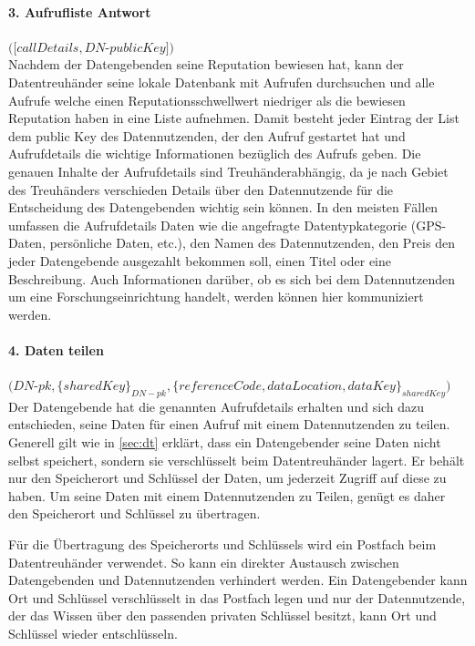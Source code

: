 \documentclass[11pt,a4paper]{scrreprt}
\begin{document}
\paragraph{3. Aufrufliste Antwort} $([callDetails, DN$-$publicKey])$\\
Nachdem der Datengebenden seine Reputation bewiesen hat, kann der Datentreuhänder seine lokale Datenbank mit Aufrufen durchsuchen und alle Aufrufe welche einen Reputationsschwellwert niedriger als die bewiesen Reputation haben in eine Liste aufnehmen. Damit besteht jeder Eintrag der List dem public Key des Datennutzenden, der den Aufruf gestartet hat und Aufrufdetails die wichtige Informationen bezüglich des Aufrufs geben. Die genauen Inhalte der Aufrufdetails sind Treuhänderabhängig, da je nach Gebiet des Treuhänders verschieden Details über den Datennutzende für die Entscheidung des Datengebenden wichtig sein können. In den meisten Fällen umfassen die Aufrufdetails Daten wie die angefragte Datentypkategorie (GPS-Daten, persönliche Daten, etc.), den Namen des Datennutzenden, den Preis den jeder Datengebende ausgezahlt bekommen soll, einen Titel oder eine Beschreibung. Auch Informationen darüber, ob es sich bei dem Datennutzenden um eine Forschungseinrichtung handelt, werden können hier kommuniziert werden.


\paragraph{4. Daten teilen} $(DN$-$pk, \{sharedKey\}_{DN-pk}, \{referenceCode, dataLocation, dataKey\}_{sharedKey})$\\
Der Datengebende hat die genannten Aufrufdetails erhalten und sich dazu entschieden, seine Daten für einen Aufruf mit einem Datennutzenden zu teilen. Generell gilt wie in \ref{sec:dt} erklärt, dass ein Datengebender seine Daten nicht selbst speichert, sondern sie verschlüsselt beim Datentreuhänder lagert. Er behält nur den Speicherort und Schlüssel der Daten, um jederzeit Zugriff auf diese zu haben. Um seine Daten mit einem Datennutzenden zu Teilen, genügt es daher den Speicherort und Schlüssel zu übertragen.

Für die Übertragung des Speicherorts und Schlüssels wird ein Postfach beim Datentreuhänder verwendet. So kann ein direkter Austausch zwischen Datengebenden und Datennutzenden verhindert werden. Ein Datengebender kann Ort und Schlüssel verschlüsselt in das Postfach legen und nur der Datennutzende, der das Wissen über den passenden privaten Schlüssel besitzt, kann Ort und Schlüssel wieder entschlüsseln.
\end{document}
